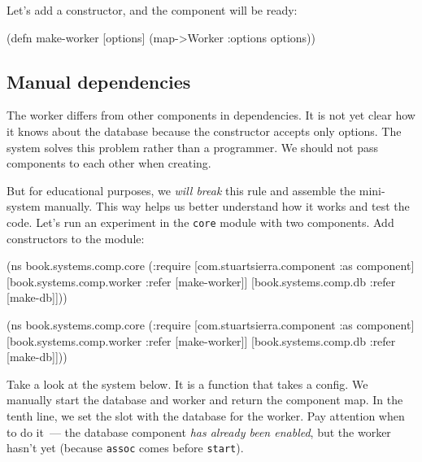 \fi

\noindent
Let's add a constructor, and the component will be ready:


\begin{english}
  \begin{clojure}
(defn make-worker
  [options]
  (map->Worker {:options options}))
  \end{clojure}
\end{english}

\subsection{Manual dependencies}


The worker differs from other components in dependencies. It is not yet clear how it knows about the database because the constructor accepts only options. The system solves this problem rather than a programmer. We should not pass components to each other when creating.

But for educational purposes, we \emph{will break} this rule and assemble the mini-system manually. This way helps us better understand how it works and test the code. Let's run an experiment in the \verb|core| module with two components. Add constructors to the module:

\ifnarrow

\begin{english}
  \begin{clojure}
(ns book.systems.comp.core
  (:require
   [com.stuartsierra.component
    :as component]
   [book.systems.comp.worker
    :refer [make-worker]]
   [book.systems.comp.db
    :refer [make-db]]))
  \end{clojure}
\end{english}

\else

\begin{english}
  \begin{clojure}
(ns book.systems.comp.core
  (:require
   [com.stuartsierra.component :as component]
   [book.systems.comp.worker :refer [make-worker]]
   [book.systems.comp.db :refer [make-db]]))
  \end{clojure}
\end{english}

\fi

Take a look at the system below. It is a function that takes a config. We manually start the database and worker and return the component map. In the tenth line, we set the slot with the database for the worker.
Pay attention when to do it~--- the database component \emph{has already been enabled}, but the worker hasn't yet (because \verb|assoc| comes before \verb|start|).

